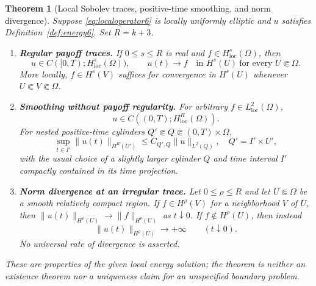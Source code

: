 \documentclass[11pt,a4paper]{article}
\newtheorem{theorem}{Theorem}[section]
\theoremstyle{definition}\newtheorem{definition}{Definition}[section]\newtheorem{example}[theorem]{Example}
\theoremstyle{remark}\newtheorem{remark}[theorem]{Remark}\newtheorem{remarkSix}{Remark}[section]
\newcommand{\loc}{\mathrm{loc}}
\newcommand{\norm}[1]{\lVert #1\rVert}
\begin{document}
\begin{theorem}[Local Sobolev traces, positive-time smoothing, and norm divergence]\label{thm:three6}
Suppose \eqref{eq:localoperator6} is locally uniformly elliptic and $u$ satisfies Definition~\ref{def:energy6}. Set $R=k+3$.
\begin{enumerate}[label=\textup{(\roman*)},leftmargin=9mm,itemsep=4pt]
\item \textbf{Regular payoff traces.} If $0\le s\le R$ is real and $f\in H^s_{\loc}(\Omega)$, then
\begin{equation}\label{eq:traceHs6}
 u\in C([0,T);H^s_{\loc}(\Omega)),\qquad
 u(t)\longrightarrow f\quad\text{in }H^s(U)
 \ \text{for every }U\Subset\Omega.
\end{equation}
More locally, $f\in H^s(V)$ suffices for convergence in $H^s(U)$ whenever $U\Subset V\Subset\Omega$.
\item \textbf{Smoothing without payoff regularity.} For arbitrary $f\in L^2_{\loc}(\Omega)$,
\begin{equation}\label{eq:smooth6}
 u\in C((0,T);H^R_{\loc}(\Omega)).
\end{equation}
For nested positive-time cylinders $Q'\Subset Q\Subset(0,T)\times\Omega$,
\begin{equation}\label{eq:quant6}
 \sup_{t\in I'}\norm{u(t)}_{H^R(U')}
 \le C_{Q',Q}\norm u_{L^2(Q)},
 \quad Q'=I'\times U',
\end{equation}
with the usual choice of a slightly larger cylinder $Q$ and time interval $I'$ compactly contained in its time projection.
\item \textbf{Norm divergence at an irregular trace.} Let $0\le\rho\le R$ and let $U\Subset\Omega$ be a smooth relatively compact region. If $f\in H^\rho(V)$ for a neighborhood $V$ of $\overline U$, then
$\norm{u(t)}_{H^\rho(U)}\to\norm f_{H^\rho(U)}$ as $t\downarrow0$.
If $f\notin H^\rho(U)$, then instead
\begin{equation}\label{eq:diverge6}
 \norm{u(t)}_{H^\rho(U)}\longrightarrow+\infty\qquad(t\downarrow0).
\end{equation}
No universal rate of divergence is asserted.
\end{enumerate}
These are properties of the \emph{given local energy solution}; the theorem is neither an existence theorem nor a uniqueness claim for an unspecified boundary problem.
\end{theorem}
\end{document}
